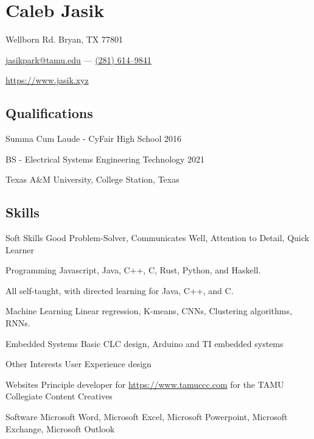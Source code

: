 \documentclass[letterpaper,10pt]{article}
\begin{document}
    \section{\Huge Caleb Jasik}\label{sec:hugecaleb-jasik}

    \hfill Wellborn Rd. Bryan, TX 77801

    \hfill \href{mailto:jasikpark@tamu.edu}{jasikpark@tamu.edu} ---
    \href{tel:2816149841}{(281) 614--9841}

    \hfill \href{https://jasik.xyz}{https://www.jasik.xyz}

    \subsection{Qualifications}\label{subsec:qualifications}

    Summa Cum Laude - CyFair High School 2016

    BS - Electrical Systems Engineering Technology 2021

    Texas A\&M University, College Station, Texas


    \subsection{Skills}\label{subsec:skills}

    \begin{skills}
        \item[Soft Skills]
        Good Problem-Solver, Communicates Well, Attention to Detail, Quick Learner
        \item[Programming]
        Javascript, Java, C++, C, Rust, Python, and Haskell.

        All self-taught, with directed learning for Java, C++, and C\@.
        \item[Machine Learning]
        Linear regression, K-means, CNNs, Clustering algorithms, RNNs.
        \item[Embedded Systems]
        Basic CLC design, Arduino and TI embedded systems
        \item[Other Interests]
        User Experience design
        \item[Websites]
        Principle developer for \href{https://www.tamuccc.com}{https://www.tamuccc.com} for the TAMU Collegiate Content Creatives
        \item[Software]
        Microsoft Word, Microsoft Excel, Microsoft Powerpoint, Microsoft Exchange, Microsoft Outlook
    \end{skills}
\end{document}
